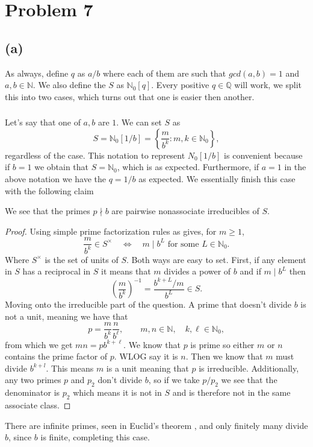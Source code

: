 \documentclass[11pt]{scrartcl}
\begin{document}
\section{Problem 7}
\subsection{(a)}

\begin{soln}
	As always, define $q$ as $a/b$ where each of them are such that $gcd(a,b)=1$
	and $a,b \in \mathbb{N}$. We also define the $S$ as $\mathbb N_0[q]$.
	Every positive $q \in \mathbb Q$ will work, we split this into two cases, which turns out that 
    one is easier then another.
    \subsubsection*{}
	Let's say that one of $a,b$ are $1$. 
	We can set $S$ as    \[
    S=\mathbb N_0[1/b]
    =\left\{\frac{m}{b^k}:m,k\in\mathbb N_0\right\},
    \]
	regardless of the case. This notation to represent $N_0[1/b]$ 
    is convenient because if  $b=1$ we obtain that $S=\mathbb{N}_0$, which 
    is as expected. Furthermore,  if $a=1$ in the above 
    notation we have the $q=1/b$ as expected. 
	We essentially finish this case with the following claim
    \begin{claim*}
        We see that the primes
		 $p\nmid b$ are pairwise nonassociate irreducibles
        of $S$.
    \end{claim*}

    \begin{proof}
        Using simple prime factorization rules as 
        gives, for $m\ge1$,
        \[
        \frac{m}{b^k}\in S^\times
        \quad\Longleftrightarrow\quad
        m\mid b^L\text{ for some }L\in\mathbb N_0.
        \]
		Where $S^\times$ is the set of units of $S$. 
		Both ways are easy to set. First, if any element 
        in $S$ has a reciprocal in $S$ it means that $m$ divides
		a power of $b$ and if $m \mid b^L$ then
        \[
        \left(\frac{m}{b^k}\right)^{-1}
        =\frac{b^{k+L}/m}{b^L}\in S.
        \]
		Moving onto the irreducible part of the question. 
		A prime that doesn't divide $b$ is not a unit, meaning we have that
        \[
        p=\frac{m}{b^k}\frac{n}{b^\ell},
        \qquad m,n\in\mathbb N,\quad k,\ell\in\mathbb N_0,
        \]
        from which we get $mn=pb^{k+\ell}$.
		We know that $p$ is prime so either $m$ or $n$ contains the prime factor of $p$.
		WLOG say it is $n$. Then we know that $m$ must divide $b^{k+l}$. This means 
		$m$ is a unit meaning that $p$ is irreducible. Additionally, any two primes $p$ and 
		$p_2$ don't divide $b$, so if we take $p/{p_2}$ we see that the denominator
		is $p_2$ which means it is not in $S$ and is therefore not in the same 
		associate class.
    \end{proof}
	There are infinite primes, seen in 
    Euclid's theorem \cite[Theorem~1.6.6]{p6-goodman},
	 and only finitely many divide $b$, since $b$ is finite,  completing this case.


\end{soln}
\end{document}
